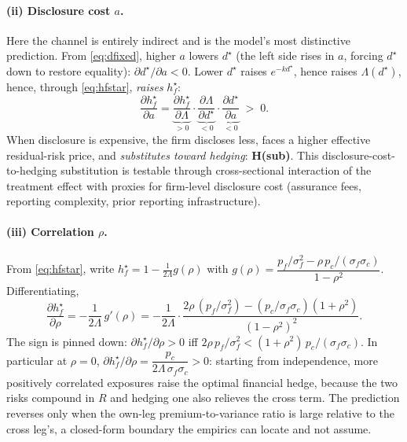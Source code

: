 \documentclass[11pt,a4paper]{article}
\begin{document}
\paragraph{(ii) Disclosure cost $a$.} Here the channel is entirely indirect and is the model's most distinctive prediction. From \eqref{eq:dfixed}, higher $a$ lowers $d^\star$ (the left side rises in $a$, forcing $d^\star$ down to restore equality): $\partial d^\star/\partial a<0$. Lower $d^\star$ raises $e^{-kd^\star}$, hence raises $\Lambda(d^\star)$, hence, through \eqref{eq:hfstar}, \emph{raises} $h_f^\star$:
\begin{equation}
\frac{\partial h_f^\star}{\partial a}=\underbrace{\frac{\partial h_f^\star}{\partial\Lambda}}_{>0}\cdot\underbrace{\frac{\partial\Lambda}{\partial d^\star}}_{<0}\cdot\underbrace{\frac{\partial d^\star}{\partial a}}_{<0}\;>\;0.
\label{eq:dhda}
\end{equation}
When disclosure is expensive, the firm discloses less, faces a higher effective residual-risk price, and \emph{substitutes toward hedging}: \textbf{H(sub)}. This disclosure-cost-to-hedging substitution is testable through cross-sectional interaction of the treatment effect with proxies for firm-level disclosure cost (assurance fees, reporting complexity, prior reporting infrastructure).

\paragraph{(iii) Correlation $\rho$.} From \eqref{eq:hfstar}, write $h_f^\star=1-\tfrac{1}{2\Lambda}g(\rho)$ with $g(\rho)=\dfrac{p_f/\sigma_f^2-\rho\,p_c/(\sigma_f\sigma_c)}{1-\rho^2}$. Differentiating,
\begin{equation}
\frac{\partial h_f^\star}{\partial\rho}=-\frac{1}{2\Lambda}\,g'(\rho)=-\frac{1}{2\Lambda}\cdot\frac{2\rho\,(p_f/\sigma_f^2)-(p_c/\sigma_f\sigma_c)(1+\rho^2)}{(1-\rho^2)^2}.
\label{eq:dhdrho}
\end{equation}
The sign is pinned down: $\partial h_f^\star/\partial\rho>0$ iff $2\rho\,p_f/\sigma_f^2<(1+\rho^2)\,p_c/(\sigma_f\sigma_c)$. In particular at $\rho=0$, $\partial h_f^\star/\partial\rho=\dfrac{p_c}{2\Lambda\,\sigma_f\sigma_c}>0$: starting from independence, more positively correlated exposures raise the optimal financial hedge, because the two risks compound in $R$ and hedging one also relieves the cross term. The prediction reverses only when the own-leg premium-to-variance ratio is large relative to the cross leg's, a closed-form boundary the empirics can locate and not assume.
\end{document}
